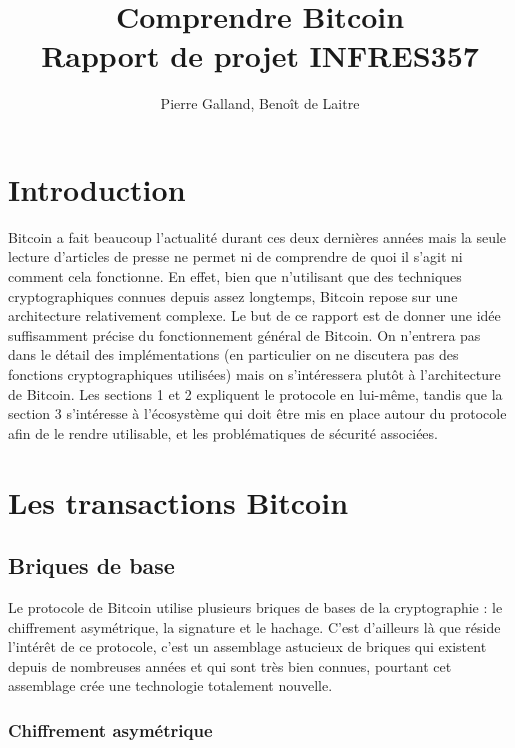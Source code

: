 \documentclass[11pt,a4paper]{article}
\title{Comprendre Bitcoin\\
Rapport de projet INFRES357
}
\author{Pierre Galland, Benoît de Laitre}
\begin{document}
\maketitle

\tableofcontents
 \nocite{*}
 
\newpage

\section*{Introduction}

Bitcoin a fait beaucoup l'actualité durant ces deux dernières années mais la seule lecture d'articles de presse ne permet ni de comprendre de quoi il s'agit ni comment cela fonctionne. En effet, bien que n'utilisant que des techniques cryptographiques connues depuis assez longtemps, Bitcoin repose sur une architecture relativement complexe. Le but de ce rapport est de donner une idée suffisamment précise du fonctionnement général de Bitcoin. On n'entrera pas dans le détail des implémentations (en particulier on ne discutera pas des fonctions cryptographiques utilisées) mais on s'intéressera plutôt à l'architecture de Bitcoin. Les sections 1 et 2 expliquent le protocole en lui-même, tandis que la section 3 s'intéresse à l'écosystème qui doit être mis en place autour du protocole afin de le rendre utilisable, et les problématiques de sécurité associées.

\section{Les transactions Bitcoin}

\subsection{Briques de base}

Le protocole de Bitcoin utilise plusieurs briques de bases de la cryptographie : le chiffrement asymétrique, la signature et le hachage. C'est d'ailleurs là que réside l'intérêt de ce protocole, c'est un assemblage astucieux de briques qui existent depuis de nombreuses années et qui sont très bien connues, pourtant cet assemblage crée une technologie totalement nouvelle.

\subsubsection{Chiffrement asymétrique}
\end{document}
